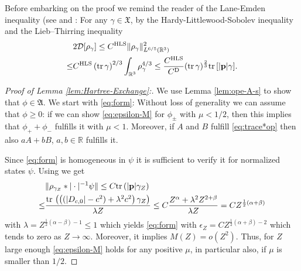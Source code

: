 \documentclass[a4paper]{amsart}
\def\tr{{\rm tr \,}}
\def\R{\mathbb{R}}
\def\bp{{\mathbf p}}
\def\cD{\mathcal{D}}
\def\gA{\mathfrak{A}}
\def\gX{\mathfrak{X}}
\def\rz{\mathbb{R}} %
\begin{document}
Before embarking on the proof we remind the reader of the Lane-Emden
inequality (see \cite[(44)]{Fournaisetal2020} and
\cite[(1)]{Carlenetal2024}: For any $\gamma\in\gX$, by the
Hardy-Littlewood-Sobolev inequality and the Lieb–Thirring inequality
\begin{equation}\label{eq:D[gamma]}
  \begin{split}
    &2\cD[\rho_\gamma]\leq C^{\rm HLS}\|\rho_{\gamma}\|_{L^{6/5}(\R^3)}^2\\
    \leq &C^{\rm HLS}\left(\tr \gamma\right)^{2/3}\int_{\R^3}\rho_{\gamma}^{4/3}\leq \frac{C^{\rm HLS}}{C^{\rm D}} (\tr\gamma)^\frac23\tr[|\bp|\gamma].
  \end{split}
\end{equation}

\begin{proof}[Proof of Lemma \ref{lem:Hartree-Exchange}:]
  We use Lemma \ref{lem:ope-A-s} to show that $\phi\in \gA$. We start
  with \eqref{eq:form}: Without loss of generality we can assume that
  $\phi\geq0$: if we can show \eqref{eq:epsilon-M} for $\phi_\pm$ with
  $\mu<1/2$, then this implies that $\phi_++\phi_-$ fulfills it with
  $\mu<1$. Moreover, if $A$ and $B$ fulfill \eqref{eq:trace*op} then
  also $a A + b B$, $a,b\in\rz$ fulfills it.

  Since \eqref{eq:form} is homogeneous in $\psi$ it is sufficient to
  verify it for normalized states $\psi$. Using
  \cite[(2.13)]{Mengetal2024} we get
  \begin{equation}
    \label{65}
    \begin{split}
      &\|\rho_{\gamma_Z}*|\cdot|^{-1}\psi\|
        \leq C\tr(|\bp|\gamma_Z)\\
      \leq&
            {\tr\left(\left((|D_{c,0}|-c^2)+\lambda^2c^2\right)\gamma_Z\right)\over\lambda Z} 
            \leq C {Z^\alpha +\lambda^2Z^{2+\beta}\over \lambda Z}
            = CZ^{\frac12(\alpha+\beta)}
    \end{split}
  \end{equation}
  with $\lambda= Z^{\frac12(\alpha-\beta)-1}\leq1$ which yields
  \eqref{eq:form} with $\epsilon_{Z}=CZ^{\frac12(\alpha+\beta)-2}$
  which tends to zero as $Z\to\infty$. Moreover, it implies
  $M(Z)=o(Z^2)$. Thus, for $Z$ large enough \eqref{eq:epsilon-M} holds
  for any positive $\mu$, in particular also, if $\mu$ is smaller than
  $1/2$.


\end{proof}
\end{document}
